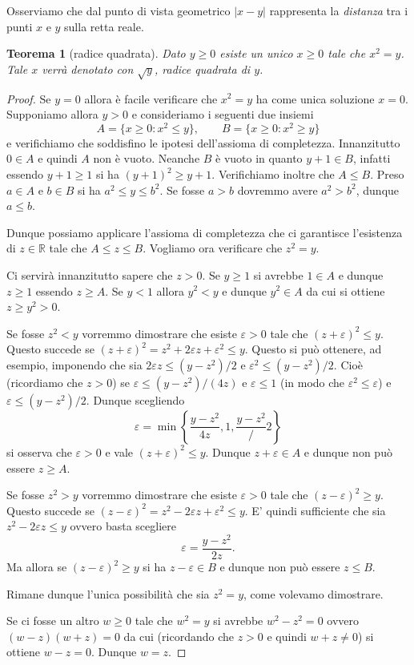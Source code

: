 \documentclass[italian,a4paper,oneside,headinclude]{scrbook}
\newcommand{\eps}{\varepsilon}
\newcommand{\RR}{\mathbb R}
\newcommand{\abs}[1]{{\left|#1\right|}}
\newtheorem{theorem}{Teorema}
\begin{document}
Osserviamo che dal punto di vista geometrico
$\abs{x-y}$ rappresenta la \emph{distanza} tra i punti
$x$ e $y$ sulla retta reale.

\begin{theorem}[radice quadrata]
Dato $y\ge 0$ esiste un unico $x\ge 0$ tale che $x^2=y$.
Tale $x$ verrà denotato con $\sqrt y$, \emph{radice quadrata} di $y$.
\marginpar{$\sqrt{\cdot}$}
\end{theorem}
\begin{proof}
Se $y=0$ allora è facile verificare che $x^2=y$ ha come unica soluzione $x=0$.
Supponiamo allora $y>0$ e
consideriamo i seguenti due insiemi
\[
  A = \{x\ge 0 \colon x^2 \le y\},\qquad
  B = \{x\ge 0 \colon x^2 \ge y\}
\]
e verifichiamo che soddisfino le ipotesi dell'assioma di completezza.
Innanzitutto $0\in A$ e quindi $A$ non è vuoto.
Neanche $B$ è vuoto in quanto $y+1\in B$,
infatti essendo $y+1\ge 1$ si ha
$(y+1)^2 \ge y+1$. Verifichiamo inoltre che $A \le B$.
Preso $a\in A$ e $b\in B$ si ha $a^2 \le y \le b^2$.
Se fosse $a>b$ dovremmo avere $a^2>b^2$, dunque $a \le b$.

Dunque possiamo applicare l'assioma di completezza
che ci garantisce l'esistenza di $z\in \RR$ tale che $A \le z \le B$.
Vogliamo ora verificare che $z^2 = y$.

Ci servirà innanzitutto sapere che $z>0$. Se $y\ge 1$ si avrebbe $1\in A$
e dunque $z\ge 1$ essendo $z\ge A$. Se $y<1$ allora $y^2 < y$ e dunque $y^2 \in A$
da cui si ottiene $z\ge y^2 > 0$.

Se fosse $z^2 < y$ vorremmo dimostrare che esiste $\eps>0$ tale che
$(z+\eps)^2 \le y$.
Questo succede se $(z+\eps)^2 = z^2 + 2 \eps z + \eps^2 \le y$.
Questo si può ottenere, ad esempio,
imponendo che sia $2\eps z \le (y-z^2)/2$ e $\eps^2 \le (y-z^2)/2$.
Cioè (ricordiamo che $z>0$) se $\eps \le (y-z^2)/(4z)$ e $\eps \le 1$
(in modo che $\eps^2 \le \eps$)
e $\eps \le (y-z^2)/2$. Dunque scegliendo
\[
\eps = \min\left\{ \frac{y-z^2}{4z}, 1, \frac{y-z^2}/2\right\}
\]
si osserva che $\eps>0$ e vale $(z+\eps)^2\le y$.
Dunque $z+\eps \in A$ e dunque non può essere $z\ge A$.

Se fosse $z^2 > y$ vorremmo dimostrare che esiste $\eps>0$ tale che
$(z-\eps)^2 \ge y$.
Questo succede se $(z-\eps)^2 = z^2 - 2\eps z + \eps^2 \le y$.
E' quindi sufficiente che sia $z^2 - 2 \eps z \le y$ ovvero basta scegliere
\[
  \eps = \frac{y-z^2}{2z}.
\]
Ma allora se $(z-\eps)^2\ge y$ si ha $z-\eps \in B$ e dunque non può
essere $z \le B$.

Rimane dunque l'unica possibilità che sia $z^2 = y$, come volevamo dimostrare.

Se ci fosse un altro $w\ge 0$ tale che $w^2 = y$ si avrebbe $w^2 - z^2=0$ ovvero
$(w-z)(w+z)=0$ da cui (ricordando che $z>0$ e quindi $w+z\neq 0$)
si ottiene $w-z=0$. Dunque $w=z$.
\end{proof}
\end{document}
